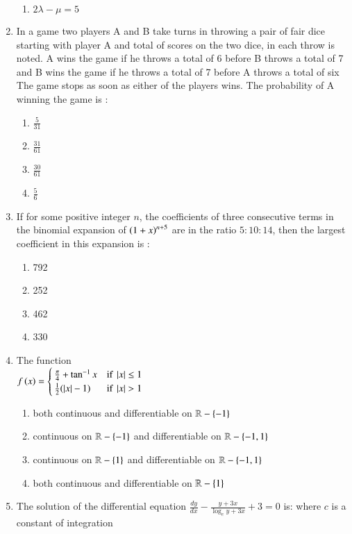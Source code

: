 \documentclass[journal]{IEEEtran}
\begin{document}
\begin{enumerate}
\begin{enumerate}
			\item $2\lambda - \mu = 5$
		\end{enumerate}
	\item 
	In a game two players A and B take turns in throwing a pair of fair dice starting with player A and total of scores on the two dice, in each throw is noted. A wins the game if he throws a total of 6 before B throws a total of 7 and B wins the game if he throws a total of 7 before A throws a total of six The game stops as soon as either of the players wins. The probability of A winning the game is :
		\begin{enumerate}
			\item $\frac{5}{31}$
			\item $\frac{31}{61}$
			\item $\frac{30}{61}$
			\item $\frac{5}{6}$
		\end{enumerate}
	\item
	If for some positive integer $n$, the coefficients of three consecutive terms in the binomial expansion of $\left(1+x\right)^{n+5}$ are in the ratio $5:10:14$, then the largest coefficient in this expansion is :
		\begin{enumerate}
			\item 792
			\item 252
			\item 462
			\item 330
		\end{enumerate}
	\item
	The function \\
	$f\left(x\right) =
	\begin{cases}
    		\frac{\pi}{4} + \tan^{-1}{x} & \text{if } \left\vert x\right\vert \leq 1 \\
    		\frac{1}{2}(\left\vert x\right\vert-1) & \text{if } \left\vert x\right\vert > 1
	\end{cases}
	$
		\begin{enumerate}
			\item  both continuous and differentiable on $\mathbb{R}-\left\{-1\right\}$
			\item continuous on $\mathbb{R}-\left\{-1\right\}$ and differentiable on $\mathbb{R}-\left\{-1,1\right\}$
			\item continuous on $\mathbb{R}-\left\{1\right\}$ and differentiable on $\mathbb{R}-\left\{-1,1\right\}$
			\item both continuous and differentiable on $\mathbb{R}-\left\{1\right\}$
		\end{enumerate}
	\item 
	The solution of the differential equation $\frac{dy}{dx}-\frac{y+3x}{\log_e{y+3x}} + 3 = 0$ is: where $c$ is a constant of integration

\end{enumerate}
\end{document}
